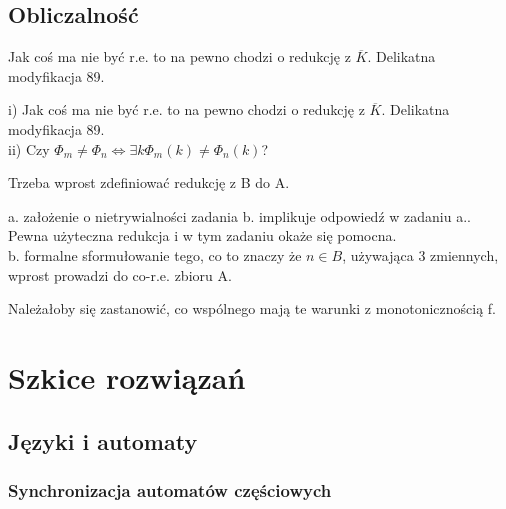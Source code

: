 \documentclass[a4paper,11pt]{article}
\newenvironment{zadanie}[1]
  {\renewcommand\theinnercustomthm{#1}\innercustomthm}
  {\endinnercustomthm}
\begin{document}
\subsection{Obliczalność}

\begin{zadanie}{92}
Jak coś ma nie być r.e. to na pewno chodzi o redukcję z $\overline{K}$. Delikatna modyfikacja 89.
\end{zadanie}

\begin{zadanie}{99}
i) Jak coś ma nie być r.e. to na pewno chodzi o redukcję z $\overline{K}$. Delikatna modyfikacja 89. \\
ii) Czy $\Phi_m \neq \Phi_n \Longleftrightarrow \exists k \Phi_m(k) \neq \Phi_n(k)$?
\end{zadanie}

\begin{zadanie}{101}
Trzeba wprost zdefiniować redukcję z B do A. 
\end{zadanie}

\begin{zadanie}{102}
a. założenie o nietrywialności zadania b. implikuje odpowiedź w zadaniu a.. Pewna użyteczna redukcja i w tym zadaniu okaże się
pomocna. \\
b. formalne sformułowanie tego, co to znaczy że $n \in B$, używająca 3 zmiennych, wprost prowadzi do co-r.e. zbioru A.
\end{zadanie}

\begin{zadanie}{103}
Należałoby się zastanowić, co wspólnego mają te warunki z monotonicznością f.
\end{zadanie}

\section{Szkice rozwiązań}

\subsection{Języki i automaty}

\subsubsection{Synchronizacja automatów częściowych}

\begin{zadanie}{40}
\end{zadanie}
\end{document}
